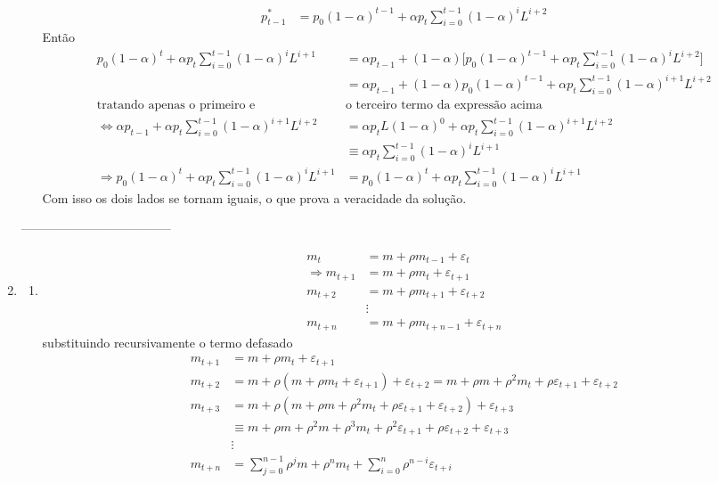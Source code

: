 \begin{enumerate}
\begin{enumerate}
\begin{align*}
		p^*_{t-1}&=p_0(1-\alpha)^{t-1}+ \alpha p_{t} \sum \limits_{i=0}^{t-1}(1-\alpha)^{i}L^{i+2}
	\end{align*}
	Então
	\begin{align*}
		p_0(1-\alpha)^t+ \alpha p_t \sum \limits_{i=0}^{t-1}(1-\alpha)^iL^{i+1}&=\alpha p_{t-1}+(1-\alpha)\bigg[p_0(1-\alpha)^{t-1}+ \alpha p_{t} \sum \limits_{i=0}^{t-1}(1-\alpha)^{i}L^{i+2}\bigg]\\
		&=\alpha p_{t-1}+(1-\alpha)p_0(1-\alpha)^{t-1}+\alpha p_t \sum \limits_{i=0}^{t-1}(1-\alpha)^{i+1}L^{i+2}\\
		\text{tratando apenas o primeiro e }&\text{o terceiro termo da expressão acima}\\
		\Longleftrightarrow \alpha p_{t-1}+\alpha p_t \sum \limits_{i=0}^{t-1}(1-\alpha)^{i+1}L^{i+2}&=\alpha p_tL(1-\alpha)^0+\alpha p_t \sum \limits_{i=0}^{t-1}(1-\alpha)^{i+1}L^{i+2}\\
		&\equiv \alpha p_t \sum \limits_{i=0}^{t-1}(1-\alpha)^{i}L^{i+1}\\
		\Rightarrow p_0(1-\alpha)^t+ \alpha p_t \sum \limits_{i=0}^{t-1}(1-\alpha)^iL^{i+1}&=	p_0(1-\alpha)^t+ \alpha p_t \sum \limits_{i=0}^{t-1}(1-\alpha)^iL^{i+1}
	\end{align*}
	Com isso os dois lados se tornam iguais, o que prova a veracidade da solução.
\end{enumerate}
	------------------------------------
	
	\item \begin{enumerate}\item 
	
	\begin{align*}
		m_t&=m+\rho m_{t-1}+\varepsilon_t\\
		\Rightarrow m_{t+1}&=m+\rho m_{t}+\varepsilon_{t+1}\\
		 m_{t+2}&=m+\rho m_{t+1}+\varepsilon_{t+2}\\
		 &\vdots\\
		  m_{t+n}&=m+\rho m_{t+n-1}+\varepsilon_{t+n}
	\end{align*}
	substituindo recursivamente o termo defasado
	\begin{align*}
	m_{t+1}	&=m+\rho m_t+\varepsilon_{t+1}\\
	m_{t+2}	&=m+\rho(m+\rho m_t+\varepsilon_{t+1})+\varepsilon_{t+2}=m+\rho m+\rho^2m_t+\rho \varepsilon_{t+1}+\varepsilon_{t+2}\\
	m_{t+3}	&=m+\rho(m+\rho m+\rho^2m_t+\rho \varepsilon_{t+1}+\varepsilon_{t+2})+\varepsilon_{t+3}\\
	&\equiv m+\rho m+\rho^2m+\rho^3m_t+\rho^2\varepsilon_{t+1}+\rho\varepsilon_{t+2}+\varepsilon_{t+3}\\
		&\vdots\\
	m_{t+n}	&=\sum\limits_{j=0}^{n-1}\rho^jm+\rho^nm_t+\sum\limits_{i=0}^{n}\rho^{n-i}\varepsilon_{t+i}
	\end{align*}
	

\end{enumerate}
\end{enumerate}
